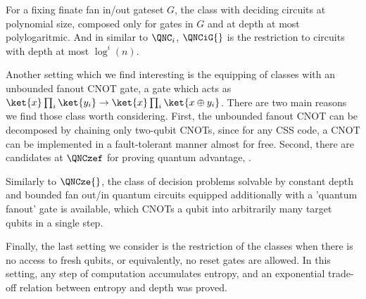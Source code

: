 \begin{definition}[$\QNCG{}$]
  For a fixing finate fan in/out gateset $G$, the class with deciding circuits at polynomial size, composed only for gates in $G$ and at depth at most polylogaritmic. And in similar to $\QNC_{i}{}$, $\QNCiG{}$ is the restriction to circuits with depth at most $\log^{i}(n)$.  
\end{definition}

Another setting which we find interesting is the equipping of classes with an unbounded fanout CNOT gate, a gate which acts as $\ket{x}\prod_{i}\ket{y_{i}} \rightarrow \ket{x}\prod_{i}\ket{x \oplus y_{i}}$. There are two main reasons we find those class worth considering. First, the unbounded fanout CNOT can be decomposed by chaining only two-qubit CNOTs, since for any CSS code, a CNOT can be implemented in a fault-tolerant manner almost for free. Second, there are candidates at $\QNCzef$ for proving quantum advantage\cite{Bremner_2017}, \cite{Paletta_2024}.


\begin{definition}[$\QNCzef{}$] 
Similarly to $\QNCze{}$, the class of decision problems solvable by constant depth and bounded fan out/in quantum circuits equipped additionally with a 'quantum fanout' gate is available, which CNOTs a qubit into arbitrarily many target qubits in a single step.
\end{definition}

Finally, the last setting we consider is the restriction of the classes when there is no access to fresh qubits, or equivalently, no reset gates are allowed. In this setting, any step of computation accumulates entropy, and an exponential trade-off relation between entropy and depth was proved.

